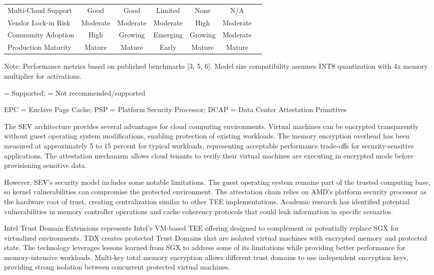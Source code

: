 \begin{table}[htbp]
{\begin{tabular}{@{}lcccccc@{}}
Multi-Cloud Support & Good & Good & Limited & None & N/A \\
Vendor Lock-in Risk & Moderate & Moderate & Moderate & High & Moderate \\
Community Adoption & High & Growing & Emerging & Growing & Moderate \\
Production Maturity & Mature & Mature & Early & Mature & Mature \\
\bottomrule
\end{tabular}
}
\begin{tablenotes}
\small
\item Note: Performance metrics based on published benchmarks [3, 5, 6]. Model size compatibility assumes INT8 quantization with 4x memory multiplier for activations.
\item {} = Supported;  = Not recommended/supported
\item EPC = Enclave Page Cache; PSP = Platform Security Processor; DCAP = Data Center Attestation Primitives
\end{tablenotes}
\end{table}

The SEV architecture provides several advantages for cloud computing environments. Virtual machines can be encrypted transparently without guest operating system modifications, enabling protection of existing workloads. The memory encryption overhead has been measured at approximately 5 to 15 percent for typical workloads, representing acceptable performance trade-offs for security-sensitive applications. The attestation mechanism allows cloud tenants to verify their virtual machines are executing in encrypted mode before provisioning sensitive data.

However, SEV's security model includes some notable limitations. The guest operating system remains part of the trusted computing base, so kernel vulnerabilities can compromise the protected environment. The attestation chain relies on AMD's platform security processor as the hardware root of trust, creating centralization similar to other TEE implementations. Academic research has identified potential vulnerabilities in memory controller operations and cache coherency protocols that could leak information in specific scenarios.

Intel Trust Domain Extensions represents Intel's VM-based TEE offering designed to complement or potentially replace SGX for virtualized environments. TDX creates protected Trust Domains that are isolated virtual machines with encrypted memory and protected state. The technology leverages lessons learned from SGX to address some of its limitations while providing better performance for memory-intensive workloads. Multi-key total memory encryption allows different trust domains to use independent encryption keys, providing strong isolation between concurrent protected virtual machines.

